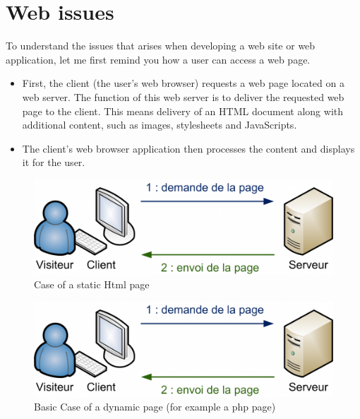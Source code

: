 \section{Web issues}

To understand the issues that arises when developing a web site or web application, let me first remind you how a user can access a web page.
\begin{itemize}
\item First, the client (the user's web browser) requests a web page located on a web server. The function of this web server is to deliver the requested web page to the client. This means delivery of an HTML document along with additional content, 
such as images, stylesheets and JavaScripts.
\item The client's web browser application then processes the content and displays it for the user.  
\end{itemize}

\begin{figure}[!l]
\centering
\includegraphics[width=.55\textwidth]{img/static.png}
\caption{Case of a static Html page}
\label{figure:static page}
\end{figure}
\begin{figure}[!r]
\centering
\includegraphics[width=.55\textwidth]{img/static.png}
\caption{Basic Case of a dynamic page (for example a php page)}
\label{figure:dynamic page}
\end{figure}

